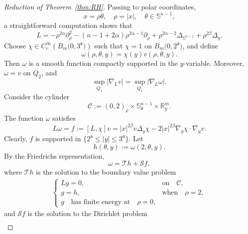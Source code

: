\documentclass[12pt]{amsart}
\begin{document}
\begin{proof}[Reduction of Theorem~\ref{thm:RH}]
Passing to polar coordinates,
\begin{equation*}
x = \rho \theta, \quad \rho = |x|,\quad \theta \in \mathbb{S}^{n-1},
\end{equation*}
a straightforward computation shows that
\begin{equation*}
L = - \rho^{2\alpha} \partial_\rho^2 - (n-1+2\alpha) \rho^{2\alpha-1} \partial_\rho + \rho^{2\alpha -2} \Delta_{\mathbb{S}^{n-1}} + \rho^{2\beta} \Delta_y.
\end{equation*}
Choose $\chi \in C_c^\infty\left( B_m\big(0, 3^{\mathfrak a}\big) \right)$ such that $\chi = 1$ on $B_m\big(0, 2^{\mathfrak a}\big)$, and define
\begin{equation*}
\omega(\rho,\theta,y) = \chi(y) v(\rho,\theta,y).
\end{equation*}
Then $\omega$ is a smooth function compactly supported in the $y$-variable. Moreover, $\omega = v$ on $Q_2$, and
\begin{equation*}
\sup_{Q_1}|\nabla_L v| = \sup_{Q_1}|\nabla_L \omega|.
\end{equation*}
Consider the cylinder
\begin{equation*}
\mathcal{C}:= (0,2)_\rho \times \mathbb{S}^{n-1}_\theta \times \mathbb{R}^m_y.
\end{equation*}
The function $\omega$ satisfies
\begin{equation*}
L \omega = f:= [L,\chi]v = |x|^{2\beta} v \Delta_y \chi - 2|x|^{2\beta} \nabla_y \chi \cdot \nabla_y v.
\end{equation*}
Clearly, $f$ is supported in $\{2^{\mathfrak a}\le |y|\le 3^{\mathfrak a}\}$. Let
\begin{equation*}
h(\theta,y) := \omega(2,\theta,y).
\end{equation*}
By the Friedrichs representation,
\begin{equation*}
\omega = \mathcal{T}h + \mathcal{S}f,
\end{equation*}
where $\mathcal{T}h$ is the solution to the boundary value problem
\begin{align}\label{BVP}
\begin{cases}
Lg = 0, & \textrm{on}\quad \mathcal{C},\\
g = h, & \textrm{when}\quad \rho=2,\\
g\quad \textrm{has finite energy at}\quad \rho=0,
\end{cases}
\end{align}
and $\mathcal{S}f$ is the solution to the Dirichlet problem
\begin{align}\label{DP}

\end{align}
\end{proof}
\end{document}
